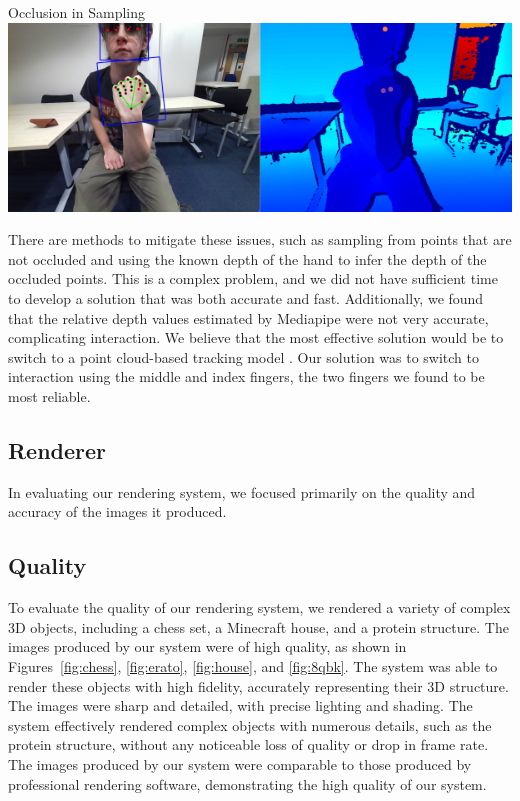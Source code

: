 \begin{figureBox}[label={fig:occlusion}, width=1.0\linewidth]{Occlusion in Sampling}
    \includegraphics[width = 1.0\linewidth]{./evaluation/figures/occulusionsampling.png}
\end{figureBox}

There are methods to mitigate these issues, such as sampling from points that are not occluded and using the known depth of the hand to infer the depth of the occluded points. This is a complex problem, and we did not have sufficient time to develop a solution that was both accurate and fast. Additionally, we found that the relative depth values estimated by Mediapipe were not very accurate, complicating interaction. We believe that the most effective solution would be to switch to a point cloud-based tracking model \cite{sharp2015accurate}. Our solution was to switch to interaction using the middle and index fingers, the two fingers we found to be most reliable.

\subsection{Renderer}

In evaluating our rendering system, we focused primarily on the quality and accuracy of the images it produced.

\subsection{Quality}

To evaluate the quality of our rendering system, we rendered a variety of complex 3D objects, including a chess set, a Minecraft house, and a protein structure. The images produced by our system were of high quality, as shown in Figures~\ref{fig:chess}, \ref{fig:erato}, \ref{fig:house}, and \ref{fig:8qbk}. The system was able to render these objects with high fidelity, accurately representing their 3D structure. The images were sharp and detailed, with precise lighting and shading. The system effectively rendered complex objects with numerous details, such as the protein structure, without any noticeable loss of quality or drop in frame rate. The images produced by our system were comparable to those produced by professional rendering software, demonstrating the high quality of our system.

